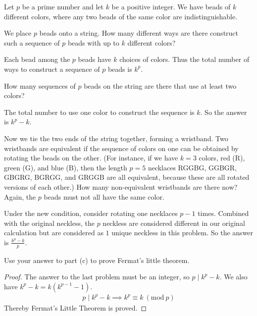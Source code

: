 \documentclass[11pt]{article}
\newcommand{\Mod}[1]{\ (\mathrm{mod}\ #1)}
\begin{document}
\newpage
{}

Let $p$ be a prime number and let $k$ be a positive integer.
We have beads of
$k$ different colors, where any two beads of the same color are indistinguishable.

\begin{Parts}

    \Part
    We place $p$ beads onto a string.
    How many different ways are there construct such a sequence of $p$ beads with up to $k$ different colors?
    \begin{Answer}
        Each bead among the $p$ beads have $k$ choices of colors. Thus the total number of ways 
        to construct a sequence of $p$ beads is $k^p$.
    \end{Answer}

    \Part 
    How many sequences of $p$ beads on the string are there that use at least two colors?
    \begin{Answer}
        The total number to use one color to construct the sequence is $k$. So the answer is $k^p - k$. 
    \end{Answer}

    \Part
    Now we tie the two ends of the string together, forming a wristband. Two wristbands are 
    equivalent if the sequence of colors on one can be obtained by rotating the beads on the other.
    (For instance, if we have $k=3$ colors, red (R), green (G), and blue (B), then the length $p = 5$
    necklaces RGGBG, GGBGR, GBGRG, BGRGG, and GRGGB are all equivalent, because these are all rotated 
    versions of each other.) How many non-equivalent wristbands are there now? Again, the $p$
    beads must not all have the same color.
    \begin{Answer}
        Under the new condition, consider rotating one necklaces $p - 1$ times. Combined with the 
        original neckless, the $p$ neckless are considered different in our original calculation 
        but are considered as $1$ unique neckless in this problem. So the answer is $\frac{k^p - k}{p}$. 
    \end{Answer}

    \Part Use your answer to part (c) to prove Fermat's little theorem.

    \begin{Answer}
        \begin{proof}
            The answer to the last problem must be an integer, so $p \mid k^p - k$. We also have 
            $k^p - k = k(k^{p - 1} - 1)$. 
            \begin{align*}
                p \mid k^p - k \implies k^p \equiv k \Mod{p}
            \end{align*}
            Thereby Fermat's Little Theorem is proved. 
        \end{proof}
    \end{Answer}

\end{Parts}
\end{document}
